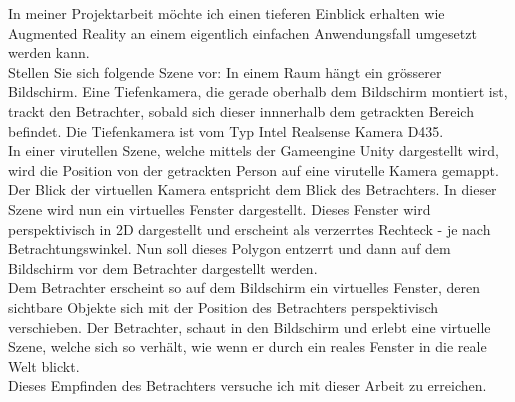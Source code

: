 
In meiner Projektarbeit möchte ich einen tieferen Einblick erhalten wie Augmented Reality an einem eigentlich einfachen Anwendungsfall umgesetzt werden kann.\\ Stellen Sie sich folgende Szene vor: In einem Raum hängt ein grösserer Bildschirm. Eine Tiefenkamera, die gerade oberhalb dem Bildschirm montiert ist, trackt den Betrachter, sobald sich dieser innnerhalb dem getrackten Bereich befindet. Die Tiefenkamera ist vom Typ Intel Realsense Kamera D435. \\ In einer virutellen Szene, welche mittels der Gameengine Unity dargestellt wird, wird die Position von der getrackten Person auf eine virutelle Kamera gemappt. Der Blick der virtuellen Kamera entspricht dem Blick des Betrachters. In dieser Szene wird nun ein virtuelles Fenster dargestellt. Dieses Fenster wird perspektivisch in 2D dargestellt und erscheint als verzerrtes Rechteck - je nach Betrachtungswinkel. Nun soll dieses Polygon entzerrt und dann auf dem Bildschirm vor dem Betrachter dargestellt werden. \\ Dem Betrachter erscheint so auf dem Bildschirm ein virtuelles Fenster, deren sichtbare Objekte sich mit der Position des Betrachters perspektivisch verschieben. Der Betrachter, schaut in den Bildschirm und erlebt eine virtuelle Szene, welche sich so verhält, wie wenn er durch ein reales Fenster in die reale Welt blickt. \\ Dieses Empfinden des Betrachters versuche ich mit dieser Arbeit zu erreichen.

